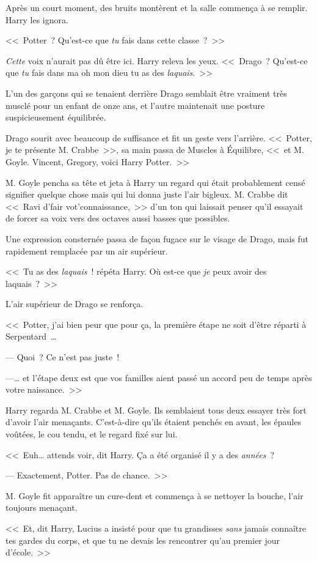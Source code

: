 Après un court moment, des bruits montèrent et la salle commença à se remplir. Harry les ignora.

<<~Potter~? Qu'est-ce que \emph{tu} fais dans cette classe~?~>>

\emph{Cette} voix n'aurait pas dû être ici. Harry releva les yeux. <<~Drago~? Qu'est-ce que \emph{tu} fais dans ma oh mon dieu tu as des \emph{laquais}.~>>

L'un des garçons qui se tenaient derrière Drago semblait être vraiment très musclé pour un enfant de onze ans, et l'autre maintenait une posture suspicieusement équilibrée.

Drago sourit avec beaucoup de suffisance et fit un geste vers l'arrière. <<~Potter, je te présente M. Crabbe~>>, sa main passa de Muscles à Équilibre, <<~et M. Goyle. Vincent, Gregory, voici Harry Potter.~>>

M. Goyle pencha sa tête et jeta à Harry un regard qui était probablement censé signifier quelque chose mais qui lui donna juste l'air bigleux. M. Crabbe dit <<~Ravi d'fair vot'connaissance,~>> d'un ton qui laissait penser qu'il essayait de forcer sa voix vers des octaves aussi basses que possibles.

Une expression consternée passa de façon fugace sur le visage de Drago, mais fut rapidement remplacée par un air supérieur.

<<~Tu as des \emph{laquais}~! répéta Harry. Où est-ce que \emph{je} peux avoir des laquais~?~>>

L'air supérieur de Drago se renforça.

<<~Potter, j'ai bien peur que pour ça, la première étape ne soit d'être réparti à Serpentard~…

--- Quoi~? Ce n'est pas juste~!

---… et l'étape deux est que vos familles aient passé un accord peu de temps après votre naissance.~>>

Harry regarda M. Crabbe et M. Goyle. Ils semblaient tous deux essayer très fort d'avoir l'air menaçants. C'est-à-dire qu'ils étaient penchés en avant, les épaules voûtées, le cou tendu, et le regard fixé sur lui.

<<~Euh… attends voir, dit Harry. Ça a été organisé il y a des \emph{années}~?

--- Exactement, Potter. Pas de chance.~>>

M. Goyle fit apparaître un cure-dent et commença à se nettoyer la bouche, l'air toujours menaçant.

<<~Et, dit Harry, Lucius a insisté pour que tu grandisses \emph{sans} jamais connaître tes gardes du corps, et que tu ne devais les rencontrer qu'au premier jour d'école.~>>

